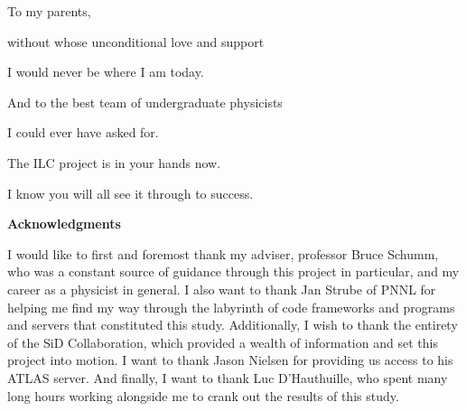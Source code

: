 \documentclass{report}
\begin{document}
    \tableofcontents


    \newpage \vspace*{\fill}
        \begin{center} \begin{large}
            To my parents, 
            
            without whose unconditional love and support
            
            I would never be where I am today.

            \vspace{40mm}

            And to the best team of undergraduate physicists
            
            I could ever have asked for.

            The ILC project is in your hands now.
            
            I know you will all see it through to success.
        \end{large} \end{center}
    \vspace*{\fill} \newpage \vspace*{\fill}
        \begin{center} \begin{large}
            \large \textbf{Acknowledgments} \vspace{\baselineskip}

            I would like to first and foremost thank my adviser, professor Bruce Schumm, who was a constant source of guidance through this project in particular, and my career as a physicist in general. I also want to thank Jan Strube of PNNL for helping me find my way through the labyrinth of code frameworks and programs and servers that constituted this study. Additionally, I wish to thank the entirety of the SiD Collaboration, which provided a wealth of information and set this project into motion. I want to thank Jason Nielsen for providing us access to his ATLAS server. And finally, I want to thank Luc D'Hauthuille, who spent many long hours working alongside me to crank out the results of this study.
        \end{large} \end{center}
    \vspace*{\fill} \newpage
\end{document}
